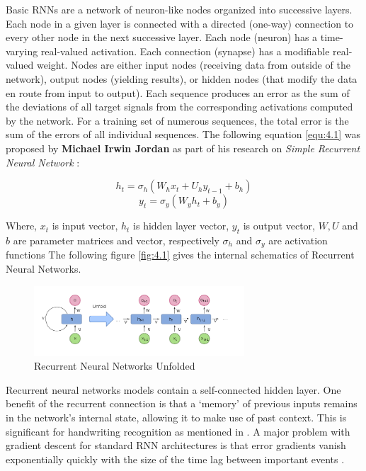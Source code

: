 \documentclass[12pt, a4paper]{report}
\begin{document}
Basic RNNs are a network of neuron-like nodes organized into successive layers. Each node in a given layer is connected with a directed (one-way) connection to every other node in the next successive layer. Each node (neuron) has a time-varying real-valued activation. Each connection (synapse) has a modifiable real-valued weight. Nodes are either input nodes (receiving data from outside of the network), output nodes (yielding results), or hidden nodes (that modify the data en route from input to output). Each sequence produces an error as the sum of the deviations of all target signals from the corresponding activations computed by the network. For a training set of numerous sequences, the total error is the sum of the errors of all individual sequences. The following equation \eqref{equ:4.1} was proposed by \textbf{Michael Irwin Jordan} as part of his research on \emph{Simple Recurrent Neural Network} \cite{wiki:rnns}:

\[h_t = \sigma_h(W_h x_t + U_h y_{t-1} + b_h)\]
\begin{equation}
    \label{equ:4.1}
    y_t = \sigma_y(W_y h_t + b_y)
\end{equation}

Where, $x_t$ is input vector, $h_t$ is hidden layer vector, $y_t$ is output vector, $W, U$ and $b$ are parameter matrices and vector, respectively $\sigma_h$ and $\sigma_y$ are activation functions The following figure \eqref{fig:4.1} gives the internal schematics of Recurrent Neural Networks.

\begin{figure}[!htbp]
    \centering
    \includegraphics[width=0.7\textwidth]{Recurrent_neural_network_unfold.png}
    \caption[Recurrent Neural Networks Unfolded]{Recurrent Neural Networks Unfolded \cite{wiki:rnns}}
    \label{fig:4.1}
\end{figure}

Recurrent neural networks models contain a self-connected hidden layer. One benefit of the recurrent connection is that a `memory' of previous inputs remains in the network’s internal state, allowing it to make use of past context. This is significant for handwriting recognition as mentioned in \cite{art:ieee:consys}. A major problem with gradient descent for standard RNN architectures is that error gradients vanish exponentially quickly with the size of the time lag between important events \cite{wiki:rnns}.
\end{document}
